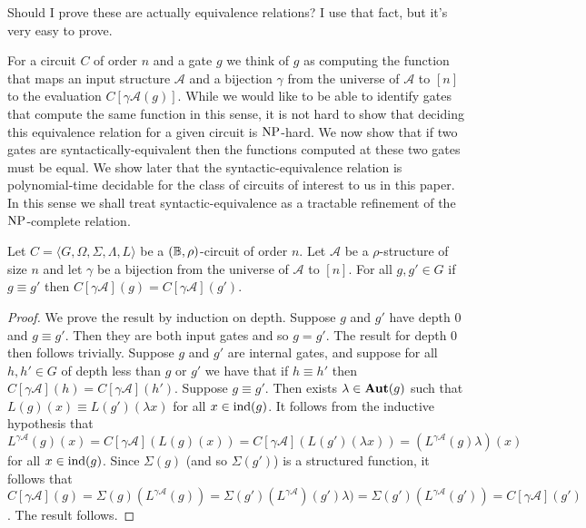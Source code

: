 \documentclass[../paper.tex]{subfiles}
\begin{document}
\begin{drem}
  Should I prove these are actually equivalence relations? I use that fact, but
  it's very easy to prove.
\end{drem}

For a circuit $C$ of order $n$ and a gate $g$ we think of $g$ as computing
the function that maps an input structure $\mathcal{A}$ and a bijection $\gamma$
from the universe of $\mathcal{A}$ to $[n]$ to the evaluation $C[\gamma
\mathcal{A}(g)]$. While we would like to be able to identify gates that compute
the same function in this sense, it is not hard to show that deciding this
equivalence relation for a given circuit is $\mathrm{NP}$-hard. We now show that if two
gates are syntactically-equivalent then the functions computed at these two
gates must be equal. We show later that the syntactic-equivalence relation is
polynomial-time decidable for the class of circuits of interest to us in this
paper. In this sense we shall treat syntactic-equivalence as a tractable
refinement of the $\mathrm{NP}$-complete relation.

\begin{lem}
  Let $C = \langle G, \Omega, \Sigma, \Lambda, L \rangle$ be a $(\mathbb{B},
  \rho)$-circuit of order $n$. Let $\mathcal{A}$ be a $\rho$-structure of size
  $n$ and let $\gamma$ be a bijection from the universe of $\mathcal{A}$ to
  $[n]$. For all $g, g' \in G$ if $g \equiv g'$ then $C[\gamma \mathcal{A}](g) =
  C[\gamma \mathcal{A}](g')$.
  \label{lem:syntactic-equivalence-equal-function}
\end{lem}
\begin{proof}
  We prove the result by induction on depth. Suppose $g$ and $g'$ have depth $0$
  and $g \equiv g'$. Then they are both input gates and so $g = g'$. The result
  for depth $0$ then follows trivially. Suppose $g$ and $g'$ are internal gates,
  and suppose for all $h, h' \in G$ of depth less than $g$ or $g'$ we have that
  if $h \equiv h'$ then $C[\gamma \mathcal{A}](h) = C[\gamma \mathcal{A}](h')$.
  Suppose $g \equiv g'$. Then exists $\lambda \in \text{\textbf{Aut}}(g)$ such that $L(g) (x)
  \equiv L(g') (\lambda x)$ for all $x \in \text{\upshape ind}(g)$. It follows from the
  inductive hypothesis that $L^{\gamma \mathcal{A}}(g)(x) = C[\gamma
  \mathcal{A}](L(g)(x)) = C[\gamma \mathcal{A}](L(g')(\lambda x)) = (L^{\gamma
    \mathcal{A}}(g) \lambda) (x)$ for all $x \in \text{\upshape ind}(g)$. Since $\Sigma(g)$
  (and so $\Sigma(g')$) is a structured function, it follows that $C[\gamma
  \mathcal{A}](g) = \Sigma(g)(L^{\gamma \mathcal{A}} (g)) = \Sigma(g')
  (L^{\gamma \mathcal{A}})(g') \lambda) = \Sigma(g') (L^{\gamma
    \mathcal{A}}(g')) = C[\gamma \mathcal{A}](g')$. The result follows.
\end{proof}
\end{document}
